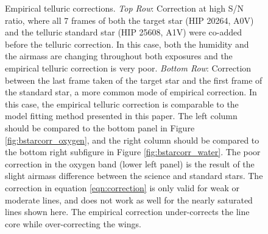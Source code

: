 \begin{figure}
\begin{center}
\caption{Empirical telluric corrections. \emph{Top Row}: Correction at high S/N ratio, where all 7 frames of both the target star (HIP 20264, A0V) and the telluric standard star (HIP 25608, A1V) were co-added before the telluric correction. In this case, both the humidity and the airmass are changing throughout both exposures and the empirical telluric correction is very poor. \emph{Bottom Row}: Correction between the last frame taken of the target star and the first frame of the standard star, a more common mode of empirical correction. In this case, the empirical telluric correction is comparable to the model fitting method presented in this paper. The left column should be compared to the bottom panel in Figure \ref{fig:bstarcorr_oxygen}, and the right column should be compared to the bottom right subfigure in Figure \ref{fig:bstarcorr_water}. The poor correction in the oxygen band (lower left panel) is the result of the slight airmass difference between the science and standard stars. The correction in equation \ref{eqn:correction} is only valid for weak or moderate lines, and does not work as well for the nearly saturated lines shown here. The empirical correction under-corrects the line core while over-correcting the wings.}

\label{fig:bstarcorr_empirical}
\end{center}
\end{figure}





